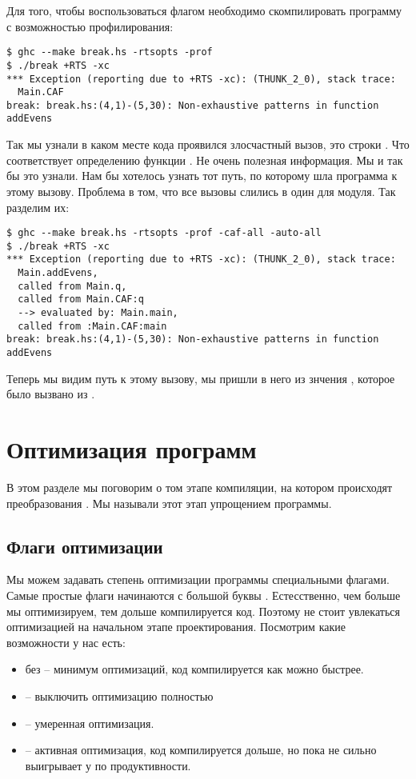 Для того, чтобы воспользоваться флагом  необходимо скомпилировать
программу с возможностью профилирования:


\begin{verbatim}
$ ghc --make break.hs -rtsopts -prof
$ ./break +RTS -xc
*** Exception (reporting due to +RTS -xc): (THUNK_2_0), stack trace: 
  Main.CAF
break: break.hs:(4,1)-(5,30): Non-exhaustive patterns in function addEvens
\end{verbatim}

Так мы узнали в каком месте кода проявился злосчастный вызов, это строки
. Что соответствует определению функции .
Не очень полезная информация. Мы и так бы это узнали. Нам бы хотелось
узнать тот путь, по которому шла программа к этому вызову. Проблема в
том, что все вызовы слились в один  для модуля. Так разделим их:


\begin{verbatim}
$ ghc --make break.hs -rtsopts -prof -caf-all -auto-all
$ ./break +RTS -xc
*** Exception (reporting due to +RTS -xc): (THUNK_2_0), stack trace: 
  Main.addEvens,
  called from Main.q,
  called from Main.CAF:q
  --> evaluated by: Main.main,
  called from :Main.CAF:main
break: break.hs:(4,1)-(5,30): Non-exhaustive patterns in function addEvens
\end{verbatim}

Теперь мы видим путь к этому вызову, мы пришли в него из знчения ,
которое было вызвано из .

\section{Оптимизация программ}

В этом разделе мы поговорим о том этапе компиляции, на котором
происходят преобразования . Мы называли этот этап
упрощением программы.

\subsection{Флаги оптимизации}

Мы можем задавать степень оптимизации программы специальными флагами.
Самые простые флаги начинаются с большой буквы . Естесственно, чем
больше мы оптимизируем, тем дольше компилируется код. Поэтому не стоит
увлекаться оптимизацией на начальном этапе проектирования. Посмотрим
какие возможности у нас есть:

\begin{itemize}
\item
  без  -- минимум оптимизаций, код компилируется как можно
  быстрее.
\item
   -- выключить оптимизацию полностью
\item
   -- умеренная оптимизация.
\item
   -- активная оптимизация, код компилируется дольше, но пока
   не сильно выигрывает у  по продуктивности.
\end{itemize}

